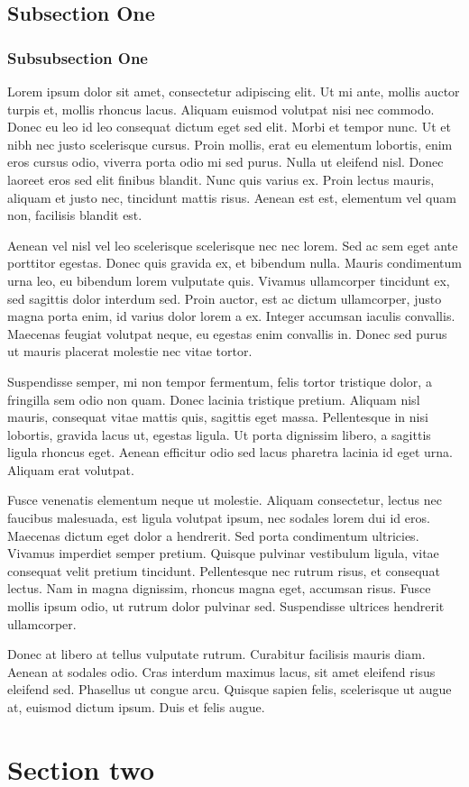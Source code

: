 \subsection{Subsection One}
\subsubsection{Subsubsection One}
Lorem ipsum dolor sit amet, consectetur adipiscing elit. Ut mi ante, mollis auctor turpis et, mollis rhoncus lacus. Aliquam euismod volutpat nisi nec commodo. Donec eu leo id leo consequat dictum eget sed elit. Morbi et tempor nunc. Ut et nibh nec justo scelerisque cursus. Proin mollis, erat eu elementum lobortis, enim eros cursus odio, viverra porta odio mi sed purus. Nulla ut eleifend nisl. Donec laoreet eros sed elit finibus blandit. Nunc quis varius ex. Proin lectus mauris, aliquam et justo nec, tincidunt mattis risus. Aenean est est, elementum vel quam non, facilisis blandit est.

Aenean vel nisl vel leo scelerisque scelerisque nec nec lorem. Sed ac sem eget ante porttitor egestas. Donec quis gravida ex, et bibendum nulla. Mauris condimentum urna leo, eu bibendum lorem vulputate quis. Vivamus ullamcorper tincidunt ex, sed sagittis dolor interdum sed. Proin auctor, est ac dictum ullamcorper, justo magna porta enim, id varius dolor lorem a ex. Integer accumsan iaculis convallis. Maecenas feugiat volutpat neque, eu egestas enim convallis in. Donec sed purus ut mauris placerat molestie nec vitae tortor.

Suspendisse semper, mi non tempor fermentum, felis tortor tristique dolor, a fringilla sem odio non quam. Donec lacinia tristique pretium. Aliquam nisl mauris, consequat vitae mattis quis, sagittis eget massa. Pellentesque in nisi lobortis, gravida lacus ut, egestas ligula. Ut porta dignissim libero, a sagittis ligula rhoncus eget. Aenean efficitur odio sed lacus pharetra lacinia id eget urna. Aliquam erat volutpat.

Fusce venenatis elementum neque ut molestie. Aliquam consectetur, lectus nec faucibus malesuada, est ligula volutpat ipsum, nec sodales lorem dui id eros. Maecenas dictum eget dolor a hendrerit. Sed porta condimentum ultricies. Vivamus imperdiet semper pretium. Quisque pulvinar vestibulum ligula, vitae consequat velit pretium tincidunt. Pellentesque nec rutrum risus, et consequat lectus. Nam in magna dignissim, rhoncus magna eget, accumsan risus. Fusce mollis ipsum odio, ut rutrum dolor pulvinar sed. Suspendisse ultrices hendrerit ullamcorper.

Donec at libero at tellus vulputate rutrum. Curabitur facilisis mauris diam. Aenean at sodales odio. Cras interdum maximus lacus, sit amet eleifend risus eleifend sed. Phasellus ut congue arcu. Quisque sapien felis, scelerisque ut augue at, euismod dictum ipsum. Duis et felis augue.
\section{Section two}
